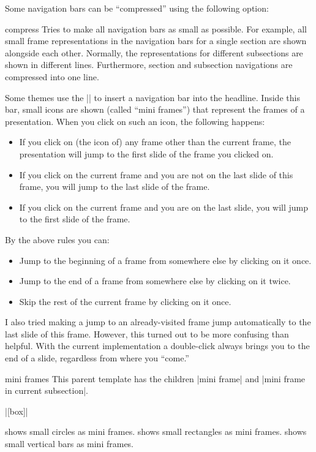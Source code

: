 Some navigation bars can be ``compressed'' using the following option:

\begin{classoption}{compress}
  Tries to make all navigation bars as small as possible. For example,
  all small frame representations in the navigation bars for a single
  section are shown alongside each other. Normally, the representations
  for different subsections are shown in different lines. Furthermore,
  section and subsection navigations are compressed into one line.
\end{classoption}



Some themes use the |\insertnavigation| to insert a navigation bar
into the headline. Inside this bar, small icons are shown (called
``mini frames'') that represent the frames of a presentation.
When you click on such an icon, the
following happens:
\begin{itemize}
\item
  If you click on (the icon of) any frame other than the current frame, the
  presentation will jump to the first slide of the frame you clicked
  on.
\item
  If you click on the current frame and you are not on the last slide
  of this frame, you will jump to the last slide of the frame.
\item
  If you click on the current frame and you are on the last slide, you
  will jump to the first slide of the frame.
\end{itemize}
By the above rules you can:
\begin{itemize}
\item
  Jump to the beginning of a frame from somewhere else by clicking on
  it once.
\item
  Jump to the end of a frame from somewhere else by clicking on it
  twice.
\item
  Skip the rest of the current frame by clicking on it once.
\end{itemize}

I also tried making a jump to an already-visited frame jump
automatically to the last slide of this frame. However, this turned
out to be more confusing than helpful. With the current implementation
a double-click always brings you to the end of a slide, regardless
from where you ``come.''

\begin{element}{mini frames}\semiyes\no\no
  This parent template has the children |mini frame| and
  |mini frame in current subsection|.

  \example |[box]|

  \begin{templateoptions}
    shows small circles as mini frames.
    shows small rectangles as mini frames.
    shows small vertical bars as mini frames.
  \end{templateoptions}
\end{element}


